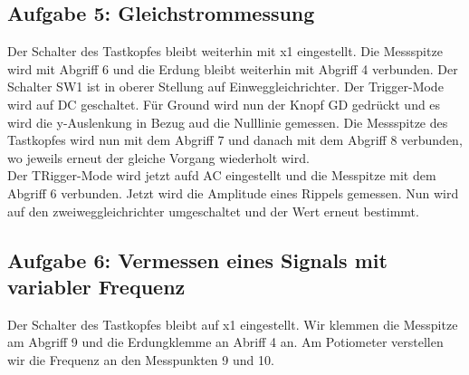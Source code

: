\subsection*{Aufgabe 5: Gleichstrommessung}
Der Schalter des Tastkopfes bleibt weiterhin mit x1 eingestellt. Die Messspitze wird mit Abgriff 6 und die Erdung bleibt weiterhin mit Abgriff 4 verbunden. Der Schalter SW1 ist in oberer Stellung auf Einweggleichrichter. Der Trigger-Mode wird auf DC geschaltet. Für Ground wird nun der Knopf GD gedrückt und es wird die y-Auslenkung in Bezug aud die Nulllinie gemessen. Die Messspitze des Tastkopfes wird nun mit dem Abgriff 7 und danach mit dem Abgriff 8 verbunden, wo jeweils erneut der gleiche Vorgang wiederholt wird.\\
Der TRigger-Mode wird jetzt aufd AC eingestellt und die Messpitze mit dem Abgriff 6 verbunden. Jetzt wird die Amplitude eines Rippels gemessen. Nun wird auf den zweiweggleichrichter umgeschaltet und der Wert erneut bestimmt.\\
\subsection*{Aufgabe 6: Vermessen eines Signals mit variabler Frequenz}
Der Schalter des Tastkopfes bleibt auf x1 eingestellt. Wir klemmen die Messpitze am Abgriff 9 und die Erdungklemme an Abriff 4 an. Am Potiometer verstellen wir die Frequenz an den Messpunkten 9 und 10. \\